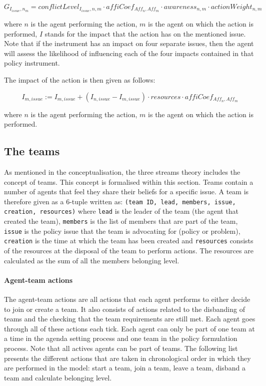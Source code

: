 \begin{equation}\label{eq:likelihoodImpact}
G_{I_{issue}, n_m} = conflictLevel_{I_{issue}, n, m} \cdot affiCoef_{Aff_n,Aff_m} \cdot awareness_{n,m} \cdot actionWeight_{n,m}
\end{equation}

where $n$ is the agent performing the action, $m$ is the agent on which the action is performed, $I$ stands for the impact that the action has on the mentioned issue. Note that if the instrument has an impact on four separate issues, then the agent will assess the likelihood of influencing each of the four impacts contained in that policy instrument.

The impact of the action is then given as follows:

\begin{equation}\label{eq:impactImpact}
I_{m, issue} := I_{m, issue} + \left( I_{n, issue} - I_{m, issue} \right) \cdot resources \cdot affiCoef_{Aff_n,Aff_m}
\end{equation}

where $n$ is the agent performing the action, $m$ is the agent on which the action is performed.


\subsection{The teams}

As mentioned in the conceptualisation, the three streams theory includes the concept of teams. This concept is formalised within this section.
Teams contain a number of agents that feel they share their beliefs for a specific issue. A team is therefore given as a 6-tuple written as: \texttt{(team ID, lead, members, issue, creation, resources)} where \texttt{lead} is the leader of the team (the agent that created the team), \texttt{members} is the list of members that are part of the team, \texttt{issue} is the policy issue that the team is advocating for (policy or problem), \texttt{creation} is the time at which the team has been created and \texttt{resources} consists of the resources at the disposal of the team to perform actions. The resources are calculated as the sum of all the members belonging level.

\paragraph{Agent-team actions}

The agent-team actions are all actions that each agent performs to either decide to join or create a team. It also consists of actions related to the disbanding of teams and the checking that the team requirements are still met. Each agent goes through all of these actions each tick. Each agent can only be part of one team at a time in the agenda setting process and one team in the policy formulation process. Note that all actives agents can be part of teams. The following list presents the different actions that are taken in chronological order in which they are performed in the model: start a team, join a team, leave a team, disband a team and calculate belonging level.

